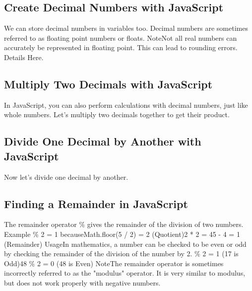 \documentclass{article}%
\begin{document}
%
\subsection{Create Decimal Numbers with JavaScript}%
\label{subsec:CreateDecimalNumberswithJavaScript}%
We can store decimal numbers in variables too. Decimal numbers are sometimes referred to as floating point numbers or floats.\newline%
NoteNot all real numbers can accurately be represented in floating point. This can lead to rounding errors. Details Here.\newline%

%
\subsection{Multiply Two Decimals with JavaScript}%
\label{subsec:MultiplyTwoDecimalswithJavaScript}%
In JavaScript, you can also perform calculations with decimal numbers, just like whole numbers.\newline%
Let's multiply two decimals together to get their product.\newline%

%
\subsection{Divide One Decimal by Another with JavaScript}%
\label{subsec:DivideOneDecimalbyAnotherwithJavaScript}%
Now let's divide one decimal by another.\newline%

%
\subsection{Finding a Remainder in JavaScript}%
\label{subsec:FindingaRemainderinJavaScript}%
The remainder operator \% gives the remainder of the division of two numbers.\newline%
Example \% 2 = 1 becauseMath.floor(5 / 2) = 2 (Quotient)2 * 2 = 45 {-} 4 = 1 (Remainder)\newline%
UsageIn mathematics, a number can be checked to be even or odd by checking the remainder of the division of the number by 2. \% 2 = 1 (17 is Odd)48 \% 2 = 0 (48 is Even)\newline%
NoteThe remainder operator is sometimes incorrectly referred to as  the "modulus" operator. It is very similar to modulus, but does not work properly with negative numbers.\newline%
\end{document}
